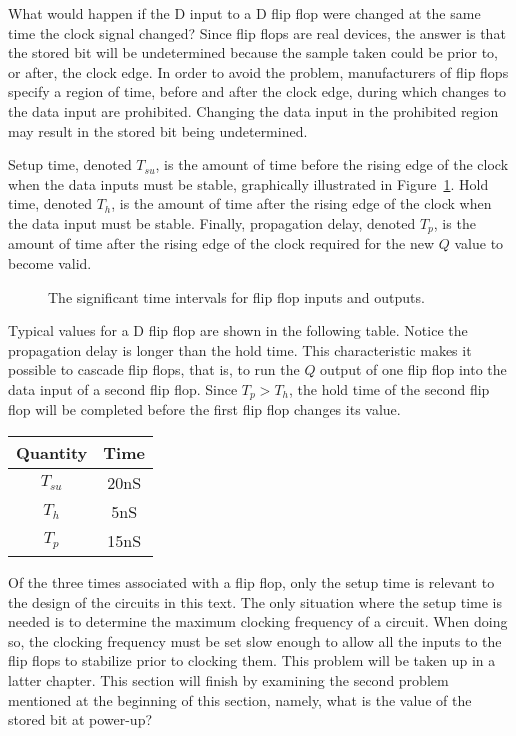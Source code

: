 What would happen if the D input to a D flip flop were changed at
the same time the clock signal changed?  Since flip flops are
real devices, the answer is that the stored bit will be
undetermined because the sample taken could be prior to,
or after, the clock edge.  In order to avoid the problem,
manufacturers of flip flops specify a region of time, before and
after the clock edge, during which changes to the data input are
prohibited.  Changing the data input in the prohibited region
may result in the stored bit being undetermined.

Setup time,  \label{page:setup} denoted $T_{su}$, is the
amount of time before the rising edge of the clock when the data
inputs must be stable, graphically illustrated in
Figure~\ref{fig:sequentialCirff-time}.  Hold time,  denoted $T_h$,
is the amount of time after the rising edge of the clock when the data
input must be stable.  Finally, propagation delay, denoted $T_p$,
 
is the amount of time after the rising edge of the clock required for the
new $Q$ value to become valid.

\begin{figure}[ht]
\caption{The significant time intervals for flip flop inputs and outputs.}
\label{fig:sequentialCirff-time}
\end{figure}

Typical values for a D flip flop are shown in the following
table.  Notice the propagation delay is longer than the hold time.
This characteristic makes it possible to cascade flip flops, that is, to
run the $Q$ output of one flip flop into the data input of a second
flip flop.  Since $T_p > T_h$, the hold time of the second flip flop
will be completed before the first flip flop changes its value.
\label{page:FFdelay}

\begin{tabular}{c|c}
Quantity & Time \\ \hline
$T_{su}$ & 20nS  \\ \hline
$T_h$    & 5nS  \\ \hline
$T_p$    & 15nS  \\
\end{tabular}

Of the three times associated with a flip flop, only the setup
time is relevant to the design of the circuits in this text.
The only situation where the setup time is needed is to determine
the maximum clocking frequency of a circuit.  When doing so,
the clocking frequency must be set slow enough to allow all the
inputs to the flip flops to stabilize prior to clocking them.  This
problem will be taken up in a latter chapter.  This section will
finish by examining the second problem mentioned at the beginning
of this section, namely, what is the value of the stored bit at power-up?

